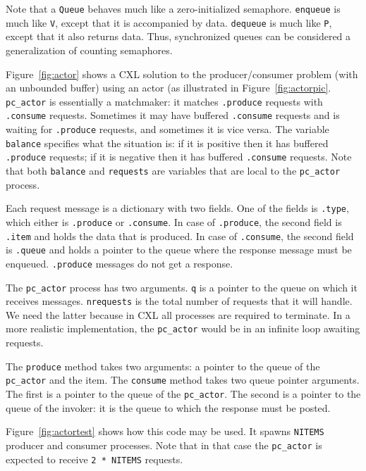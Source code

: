\documentclass{report}
\begin{document}
Note that a \texttt{Queue} behaves much like a zero-initialized semaphore.
\texttt{enqueue} is much like \texttt{V}, except that it is accompanied by data.
\texttt{dequeue} is much like \texttt{P}, except that it also returns data.
Thus, synchronized queues can be considered a generalization of counting semaphores.

Figure~\ref{fig:actor} shows a CXL solution to the producer/consumer problem
(with an unbounded buffer)
using an actor (as illustrated in Figure~\ref{fig:actorpic}.
\texttt{pc\_actor} is essentially a matchmaker: it matches
\texttt{.produce} requests with \texttt{.consume} requests.
Sometimes it may have buffered \texttt{.consume} requests and is waiting for
\texttt{.produce} requests, and sometimes it is vice versa.
The variable \texttt{balance} specifies what the situation is: if it is positive
then it has buffered \texttt{.produce} requests;
if it is negative
then it has buffered \texttt{.consume} requests.
Note that both \texttt{balance} and \texttt{requests} are variables that are
local to the \texttt{pc\_actor} process.

Each request message is a dictionary with two fields.  One of the fields is
\texttt{.type}, which either is \texttt{.produce} or \texttt{.consume}.
In case of \texttt{.produce}, the second field is \texttt{.item} and holds
the data that is produced.
In case of \texttt{.consume}, the second field is \texttt{.queue} and holds
a pointer to the queue where the response message must be enqueued.
\texttt{.produce} messages do not get a response.

The \texttt{pc\_actor} process has two arguments.  \texttt{q} is a pointer
to the queue on which it receives messages.  \texttt{nrequests} is the total
number of requests that it will handle.  We need the latter because in CXL
all processes are required to terminate.  In a more realistic implementation,
the \texttt{pc\_actor} would be in an infinite loop awaiting requests.

The \texttt{produce} method takes two arguments: a pointer to the queue
of the \texttt{pc\_actor} and the item.  The \texttt{consume} method
takes two queue pointer arguments.  The first is a pointer to the queue
of the \texttt{pc\_actor}.  The second is a pointer to the queue of the
invoker: it is the queue to which the response must be posted.

Figure~\ref{fig:actortest} shows how this code may be used.  It spawns
\texttt{NITEMS} producer and consumer processes.  Note that in that
case the \texttt{pc\_actor} is expected to receive \texttt{2 * NITEMS}
requests.
\end{document}
